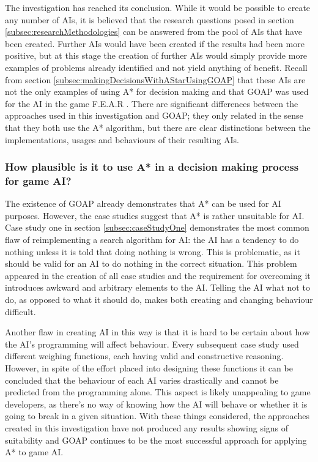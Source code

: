 \documentclass[11pt, a4paper]{report}
\begin{document}
The investigation has reached its conclusion. While it would be possible to create any number of AIs, it is believed that the research questions posed in section \ref{subsec:researchMethodologies} can be answered from the pool of AIs that have been created. Further AIs would have been created if the results had been more positive, but at this stage the creation of further AIs would simply provide more examples of problems already identified and not yield anything of benefit. Recall from section \ref{subsec:makingDecisionsWithAStarUsingGOAP} that these AIs are not the only examples of using A* for decision making and that GOAP \parencite{orkin2003applying} was used for the AI in the game F.E.A.R \parencite{FEAR}. There are significant differences between the approaches used in this investigation and GOAP; they only related in the sense that they both use the A* algorithm, but there are clear distinctions between the implementations, usages and behaviours of their resulting AIs.

\subsubsection{How plausible is it to use A* in a decision making process for game AI?}

The existence of GOAP already demonstrates that A* can be used for AI purposes. However, the case studies suggest that A* is rather unsuitable for AI. Case study one in section \ref{subsec:caseStudyOne} demonstrates the most common flaw of reimplementing a search algorithm for AI: the AI has a tendency to do nothing unless it is told that doing nothing is wrong. This is problematic, as it should be valid for an AI to do nothing in the correct situation. This problem appeared in the creation of all case studies and the requirement for overcoming it introduces awkward and arbitrary elements to the AI. Telling the AI what not to do, as opposed to what it should do, makes both creating and changing behaviour difficult.

Another flaw in creating AI in this way is that it is hard to be certain about how the AI's programming will affect behaviour. Every subsequent case study used different weighing functions, each having valid and constructive reasoning. However, in spite of the effort placed into designing these functions it can be concluded that the behaviour of each AI varies drastically and cannot be predicted from the programming alone. This aspect is likely unappealing to game developers, as there's no way of knowing how the AI will behave or whether it is going to break in a given situation. With these things considered, the approaches created in this investigation have not produced any results showing signs of suitability and GOAP continues to be the most successful approach for applying A* to game AI. 
\end{document}
